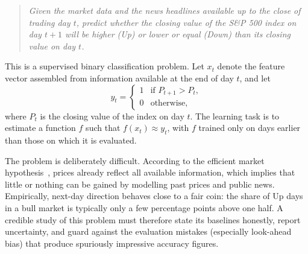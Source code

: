 \begin{quote}
\emph{Given the market data and the news headlines available up to the close of trading day $t$, predict whether the closing value of the S\&P 500 index on day $t+1$ will be higher (Up) or lower or equal (Down) than its closing value on day $t$.}
\end{quote}

This is a supervised binary classification problem. Let $x_t$ denote the feature vector assembled from information available at the end of day $t$, and let
\begin{equation}
y_t =
\begin{cases}
1 & \text{if } P_{t+1} > P_t,\\
0 & \text{otherwise,}
\end{cases}
\label{eq:target}
\end{equation}
where $P_t$ is the closing value of the index on day $t$. The learning task is to estimate a function $f$ such that $f(x_t) \approx y_t$, with $f$ trained only on days earlier than those on which it is evaluated.

The problem is deliberately difficult. According to the efficient market hypothesis~\cite{fama1970efficient}, prices already reflect all available information, which implies that little or nothing can be gained by modelling past prices and public news. Empirically, next-day direction behaves close to a fair coin: the share of Up days in a bull market is typically only a few percentage points above one half. A credible study of this problem must therefore state its baselines honestly, report uncertainty, and guard against the evaluation mistakes (especially look-ahead bias) that produce spuriously impressive accuracy figures.

